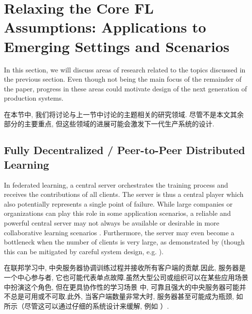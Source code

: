 
\section{Relaxing the Core FL Assumptions: Applications to Emerging Settings and Scenarios}
\label{sec:relaxing}


In this section, we will discuss areas of research related to the topics discussed in the previous section. Even though not being the main focus of the remainder of the paper, progress in these areas could motivate design of the next generation of production systems.

在本节中, 我们将讨论与上一节中讨论的主题相关的研究领域. 尽管不是本文其余部分的主要重点, 但这些领域的进展可能会激发下一代生产系统的设计.

\subsection{Fully Decentralized / Peer-to-Peer Distributed Learning}
\label{sec:decentralized}

In federated learning, a central server orchestrates the training process and receives the contributions of all clients. The server is thus a central player which also potentially represents a single point of failure. While large companies or organizations can play this role in some application scenarios, a reliable and powerful central server may not always be available or desirable in more collaborative learning scenarios \citep{Vanhaesebrouck2017}. Furthermore, the server may even become a bottleneck when the number of clients is very large, as demonstrated by \citet{Lian2017b} (though this can be mitigated by careful system design, e.g. \citep{bonawitz19sysml}).

在联邦学习中, 中央服务器协调训练过程并接收所有客户端的贡献.因此, 服务器是一个中心参与者, 它也可能代表单点故障.虽然大型公司或组织可以在某些应用场景中扮演这个角色, 但在更具协作性的学习场景 \citep{Vanhaesebrouck2017} 中, 可靠且强大的中央服务器可能并不总是可用或不可取.此外, 当客户端数量非常大时, 服务器甚至可能成为瓶颈, 如 \citet{Lian2017b} 所示（尽管这可以通过仔细的系统设计来缓解, 例如 \citep{bonawitz19sysml}）.

